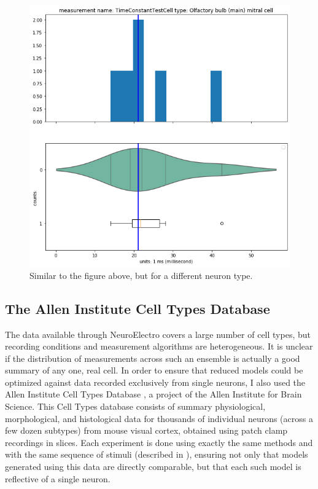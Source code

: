\begin{figure}
\begin{center}
\includegraphics[scale=0.8]{chapters/notebooks_converted/needata_thesis_files/needata_thesis_5_23}
\caption{Similar to the figure above, but for a different neuron type.}
\label{fig:uniform-feature2}
\end{center}
\end{figure}

\subsection{The Allen Institute Cell Types Database}
The data available through NeuroElectro covers a large number of cell types, but recording conditions and measurement algorithms are heterogeneous.
It is unclear if the distribution of measurements across such an ensemble is actually a good summary of any one, real cell.
In order to ensure that reduced models could be optimized against data recorded exclusively from single neurons, I also used the Allen Institute Cell Types Database \citep{celltypes}, a project of the Allen Institute for Brain Science.
This Cell Types database consists of summary physiological, morphological, and histological data for thousands of individual neurons (across a few dozen subtypes) from mouse visual cortex, obtained using patch clamp recordings in slices.
Each experiment is done using exactly the same methods and with the same sequence of stimuli (described in \cite{celltypes}), ensuring not only that models generated using this data are directly comparable, but that each such model is reflective of a single neuron.

